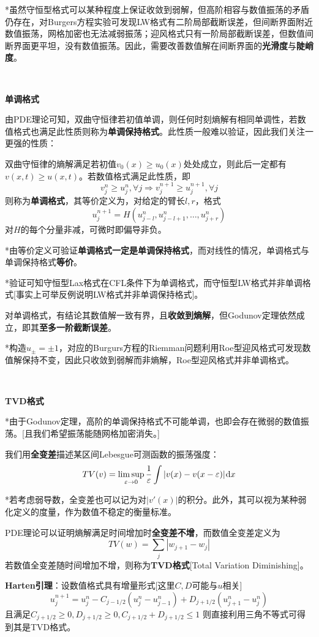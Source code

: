 \documentclass[a4paper,UTF8,fontset=windows]{ctexart}
\newcommand*{\dr}{\hspace{0.07em}\mathrm{d}}
\begin{document}
*虽然守恒型格式可以某种程度上保证收敛到弱解，但高阶相容与数值振荡的矛盾仍存在，对Burgers方程实验可发现LW格式有二阶局部截断误差，但间断界面附近数值振荡，网格加密也无法减弱振荡；迎风格式只有一阶局部截断误差，但数值间断界面更平坦，没有数值振荡。因此，需要改善数值解在间断界面的\textbf{光滑度}与\textbf{陡峭度}。

\

\textbf{单调格式}

由PDE理论可知，双曲守恒律若初值单调，则任何时刻熵解有相同单调性，若数值格式也满足此性质则称为\textbf{单调保持格式}。此性质一般难以验证，因此我们关注一更强的性质：

双曲守恒律的熵解满足若初值$v_0(x)\ge u_0(x)$处处成立，则此后一定都有$v(x,t)\ge u(x,t)$。若数值格式满足此性质，即
$$v_j^n\ge u_j^n,\forall j\Longrightarrow v_j^{n+1}\ge u_j^{n+1},\forall j$$
则称为\textbf{单调格式}，其等价定义为，对给定的臂长$l,r$，格式
$$u_j^{n+1}=H(u_{j-l}^n,u_{j-l+1}^n,\dots,u_{j+r}^n)$$
对$H$的每个分量非减，可微时即偏导非负。

*由等价定义可验证\textbf{单调格式一定是单调保持格式}，而对线性的情况，单调格式与单调保持格式\textbf{等价}。

*验证可知守恒型Lax格式在CFL条件下为单调格式，而守恒型LW格式并非单调格式[事实上可举反例说明LW格式并非单调保持格式]。

对单调格式，有结论其数值解一致有界，且\textbf{收敛到熵解}，但Godunov定理依然成立，即其\textbf{至多一阶截断误差}。

*构造$u_\pm=\pm1$，对应的Burgurs方程的Riemman问题利用Roe型迎风格式可发现数值解保持不变，因此只收敛到弱解而非熵解，Roe型迎风格式并非单调格式。

\

\textbf{TVD格式}

*由于Godunov定理，高阶的单调保持格式不可能单调，也即会存在微弱的数值振荡。[且我们希望振荡能随网格加密消失。]

我们用\textbf{全变差}描述某区间Lebesgue可测函数的振荡强度：
$$TV(v)=\limsup_{\varepsilon\to0}\frac{1}{\varepsilon}\int|v(x)-v(x-\varepsilon)|\dr x$$

*若考虑弱导数，全变差也可以记为对$|v'(x)|$的积分。此外，其可以视为某种弱化定义的度量，作为数值不稳定的衡量标准。

PDE理论可以证明熵解满足时间增加时\textbf{全变差不增}，而数值全变差定义为
$$TV(w)=\sum_j|w_{j+1}-w_j|$$
若数值全变差随时间增加不增，则称为\textbf{TVD格式}[Total Variation Diminishing]。

\textbf{Harten引理}：设数值格式具有增量形式[这里$C,D$可能与$u$相关]
$$u_j^{n+1}=u_j^n-C_{j-1/2}(u_j^n-u_{j-1}^n)+D_{j+1/2}(u_{j+1}^n-u_j^n)$$
且满足$C_{j+1/2}\ge0,D_{j+1/2}\ge0,C_{j+1/2}+D_{j+1/2}\le1$
则直接利用三角不等式可得到其是TVD格式。
\end{document}

